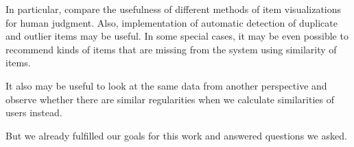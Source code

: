 \documentclass[
  digital, %
  table,   %
  nolof,     %
  nolot,     %
  nocover,
  color,
  final, %
]{fithesis3}
\begin{document}
In particular, compare the usefulness of different methods of item visualizations for human judgment. Also, implementation of automatic detection of duplicate and outlier items may be useful. In some special cases, it may be even possible to recommend kinds of items that are missing from the system using similarity of items.

It also may be useful to look at the same data from another perspective and observe whether there are similar regularities when we calculate similarities of users instead.


But we already fulfilled our goals for this work and answered questions we asked.


\makeatletter\thesis@blocks@clear\makeatother

\end{document}
